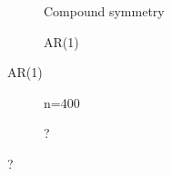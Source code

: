 \documentclass[12pt,a4paper]{article}
\begin{document}
\begin{figure}[h]
\centering
\caption{\footnotesize [TODO].}	
	\begin{subfigure}{.5\textwidth}
	  \centering
	  \caption{Compound symmetry}  %
	\end{subfigure}%
	\begin{subfigure}{.5\textwidth}
	  \centering
	  \caption{AR(1)} %
	\end{subfigure}
\end{figure}



\begin{figure}[h]
\centering
\caption{\footnotesize [TODO].}	
	\begin{subfigure}{.5\textwidth}
	  \centering
	  \caption{n=400}  %
	\end{subfigure}%
	\begin{subfigure}{.5\textwidth}
	  \centering
	  \caption{?} %
	\end{subfigure}
\end{figure}
\end{document}
